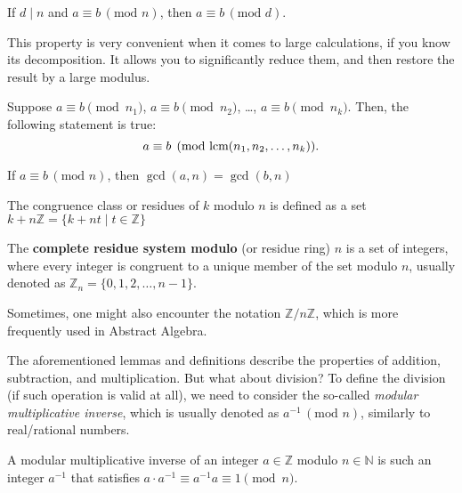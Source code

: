 \documentclass[../lecture-notes-148x210.tex]{subfiles}
\begin{document}
\begin{lemma}
    If $d \mid n$ and $a \equiv b \, (\text{mod } n)$, then $a \equiv b \, (\text{mod } d)$.
\end{lemma}

This property is very convenient when it comes to large calculations, if you know its decomposition.
It allows you to significantly reduce them, and then restore the result by a large modulus.

\begin{lemma}
    Suppose $a \equiv b \pmod{n_1}$, $a \equiv b \pmod{n_2}$, \ldots, $a \equiv b \pmod{n_k}$. Then, the following statement is true: 
    \begin{equation*}
        a \equiv b \pmod{\text{lcm}(n_1, n_2, \dots, n_k)}.
    \end{equation*}
\end{lemma}

\begin{lemma}
    If $a \equiv b \, (\text{mod } n)$, then $\gcd(a, n) = \gcd(b, n)$
\end{lemma}

\begin{definition}
    The congruence class or residues of $k$ modulo $n$ is defined as a set $k + n\mathbb{Z} = \{ k + nt \mid t \in \mathbb{Z}\}$    
\end{definition}

\begin{definition}
    The \textbf{complete residue system modulo} (or residue ring) $n$ is a set of integers, where
    every integer is congruent to a unique member of the set modulo $n$, usually denoted
    as $\mathbb{Z}_n = \{0, 1, 2, \dots, n-1\}$.
\end{definition}

\begin{remark}
    Sometimes, one might also encounter the notation $\mathbb{Z}/n\mathbb{Z}$, which is more frequently used in Abstract Algebra.
\end{remark}

The aforementioned lemmas and definitions describe the properties of addition, subtraction, and multiplication. But what about division? To define the division (if such operation is valid at all), we need to consider the so-called \emph{modular multiplicative inverse}, which is usually denoted as $a^{-1} \, (\text{mod } n)$, similarly to real/rational numbers.

\begin{definition}
    A modular multiplicative inverse of an integer $a \in \mathbb{Z}$ modulo $n \in \mathbb{N}$ is such an integer $a^{-1}$ that satisfies $a \cdot a^{-1} \equiv a^{-1}a \equiv 1 \pmod{n}$.
\end{definition}
\end{document}
